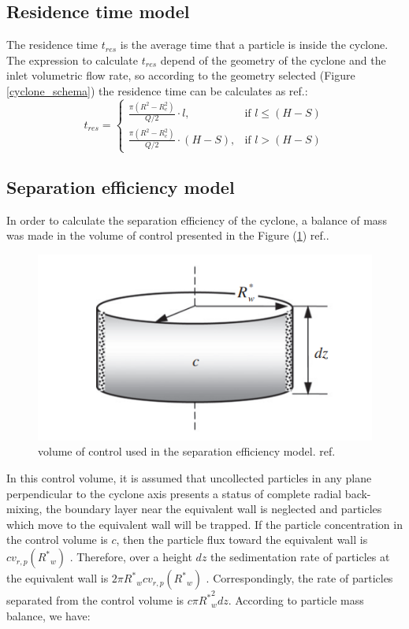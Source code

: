 \subsection{Residence time model} 
The residence time $t_{res}$ is the average time  that a particle is inside the cyclone. The expression to calculate $t_{res}$ depend of the geometry of the cyclone and the inlet volumetric flow rate, so according to the geometry selected (Figure \ref{cyclone_schema}) the residence time can be calculates as ref.\cite{Zhao2011}:
\begin{equation}\label{residence_time_equation}
	t_{res}= 
	\begin{cases}
		\frac{\pi \left( R^2 - R_e ^ 2\right) }{Q/2} \cdot l,& \text{if } l\leq (H-S)\\
		\frac{\pi \left( R^2 - R_e ^ 2\right)}{Q/2} \cdot (H-S),& \text{if } l> (H-S)
	\end{cases}
\end{equation}

\subsection{Separation efficiency model}
In order to calculate the separation efficiency of the cyclone, a balance of mass was made in the volume of control presented in the Figure (\ref{volume_control}) ref.\cite{Zhao2011,Wei2016}.
\begin{figure}[H]
	\centering
	\includegraphics[width=0.5\linewidth]{images/control_volume.png}
	\captionsetup{font=bf, size=small}
	\caption{volume of control used in the separation efficiency model. ref.\cite{Zhao2011}}
	\label{volume_control}
\end{figure}
In this control volume, it is assumed that uncollected particles in any plane perpendicular to the cyclone axis presents a status of complete radial back-mixing, the boundary layer near the equivalent wall is neglected and particles which move to the equivalent wall will be trapped. If the particle concentration in the control volume is
$c$, then the particle flux toward the equivalent wall is $c v_{r,p}({{R^*}} _w)$ . Therefore, over a height $dz$ the sedimentation rate of particles at the equivalent wall is $ 2 \pi {{R^*}} _w c v_{r,p}({R^*} _w) $ . Correspondingly, the rate of particles separated from the control volume is $c \pi {{R^*}} _w^2 dz$.
According to particle mass balance, we have:


